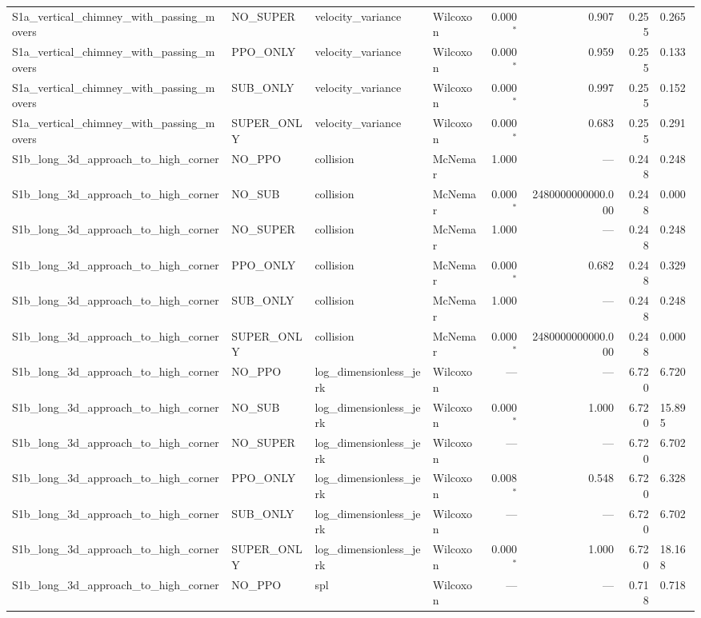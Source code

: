 \begin{tabular}{llllrrrl}
  S1a_vertical_chimney_with_passing_movers & NO_SUPER & velocity_variance & Wilcoxon & 0.000$^{*}$ & 0.907 & 0.255 & 0.265 \\
  S1a_vertical_chimney_with_passing_movers & PPO_ONLY & velocity_variance & Wilcoxon & 0.000$^{*}$ & 0.959 & 0.255 & 0.133 \\
  S1a_vertical_chimney_with_passing_movers & SUB_ONLY & velocity_variance & Wilcoxon & 0.000$^{*}$ & 0.997 & 0.255 & 0.152 \\
  S1a_vertical_chimney_with_passing_movers & SUPER_ONLY & velocity_variance & Wilcoxon & 0.000$^{*}$ & 0.683 & 0.255 & 0.291 \\
  S1b_long_3d_approach_to_high_corner & NO_PPO & collision & McNemar & 1.000 & --- & 0.248 & 0.248 \\
  S1b_long_3d_approach_to_high_corner & NO_SUB & collision & McNemar & 0.000$^{*}$ & 2480000000000.000 & 0.248 & 0.000 \\
  S1b_long_3d_approach_to_high_corner & NO_SUPER & collision & McNemar & 1.000 & --- & 0.248 & 0.248 \\
  S1b_long_3d_approach_to_high_corner & PPO_ONLY & collision & McNemar & 0.000$^{*}$ & 0.682 & 0.248 & 0.329 \\
  S1b_long_3d_approach_to_high_corner & SUB_ONLY & collision & McNemar & 1.000 & --- & 0.248 & 0.248 \\
  S1b_long_3d_approach_to_high_corner & SUPER_ONLY & collision & McNemar & 0.000$^{*}$ & 2480000000000.000 & 0.248 & 0.000 \\
  S1b_long_3d_approach_to_high_corner & NO_PPO & log_dimensionless_jerk & Wilcoxon & --- & --- & 6.720 & 6.720 \\
  S1b_long_3d_approach_to_high_corner & NO_SUB & log_dimensionless_jerk & Wilcoxon & 0.000$^{*}$ & 1.000 & 6.720 & 15.895 \\
  S1b_long_3d_approach_to_high_corner & NO_SUPER & log_dimensionless_jerk & Wilcoxon & --- & --- & 6.720 & 6.702 \\
  S1b_long_3d_approach_to_high_corner & PPO_ONLY & log_dimensionless_jerk & Wilcoxon & 0.008$^{*}$ & 0.548 & 6.720 & 6.328 \\
  S1b_long_3d_approach_to_high_corner & SUB_ONLY & log_dimensionless_jerk & Wilcoxon & --- & --- & 6.720 & 6.702 \\
  S1b_long_3d_approach_to_high_corner & SUPER_ONLY & log_dimensionless_jerk & Wilcoxon & 0.000$^{*}$ & 1.000 & 6.720 & 18.168 \\
  S1b_long_3d_approach_to_high_corner & NO_PPO & spl & Wilcoxon & --- & --- & 0.718 & 0.718 \\

\end{tabular}
